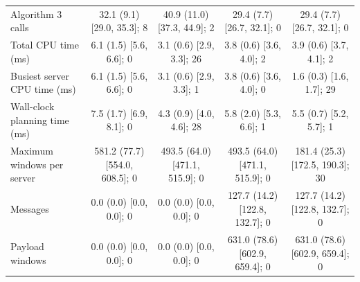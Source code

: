 \begin{table}[t]
\begin{tabular}{lcccc}
Algorithm 3 calls & 32.1 (9.1) [29.0, 35.3]; 8 & 40.9 (11.0) [37.3, 44.9]; 2 & 29.4 (7.7) [26.7, 32.1]; 0 & 29.4 (7.7) [26.7, 32.1]; 0 \\
Total CPU time (ms) & 6.1 (1.5) [5.6, 6.6]; 0 & 3.1 (0.6) [2.9, 3.3]; 26 & 3.8 (0.6) [3.6, 4.0]; 2 & 3.9 (0.6) [3.7, 4.1]; 2 \\
Busiest server CPU time (ms) & 6.1 (1.5) [5.6, 6.6]; 0 & 3.1 (0.6) [2.9, 3.3]; 1 & 3.8 (0.6) [3.6, 4.0]; 0 & 1.6 (0.3) [1.6, 1.7]; 29 \\
Wall-clock planning time (ms) & 7.5 (1.7) [6.9, 8.1]; 0 & 4.3 (0.9) [4.0, 4.6]; 28 & 5.8 (2.0) [5.3, 6.6]; 1 & 5.5 (0.7) [5.2, 5.7]; 1 \\
Maximum windows per server & 581.2 (77.7) [554.0, 608.5]; 0 & 493.5 (64.0) [471.1, 515.9]; 0 & 493.5 (64.0) [471.1, 515.9]; 0 & 181.4 (25.3) [172.5, 190.3]; 30 \\
Messages & 0.0 (0.0) [0.0, 0.0]; 0 & 0.0 (0.0) [0.0, 0.0]; 0 & 127.7 (14.2) [122.8, 132.7]; 0 & 127.7 (14.2) [122.8, 132.7]; 0 \\
Payload windows & 0.0 (0.0) [0.0, 0.0]; 0 & 0.0 (0.0) [0.0, 0.0]; 0 & 631.0 (78.6) [602.9, 659.4]; 0 & 631.0 (78.6) [602.9, 659.4]; 0 \\
\bottomrule
\end{tabular}
\end{table}

